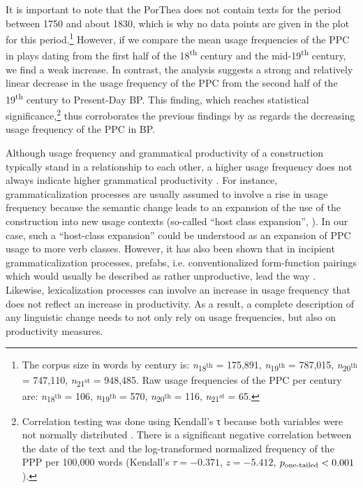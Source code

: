 \documentclass[output=paper,colorlinks,citecolor=brown]{langscibook}
\begin{document}
It is important to note that the PorThea does not contain texts for the period between 1750 and about 1830, which is why no data points are given in the plot for this period.\footnote{The corpus size in words by century is: \textit{n}\textsubscript{18\textsuperscript{th}} = 175,891, \textit{n}\textsubscript{19\textsuperscript{th}} = 787,015, \textit{n}\textsubscript{20\textsuperscript{th}} = 747,110, \textit{n}\textsubscript{21\textsuperscript{st}} = 948,485. Raw usage frequencies of the PPC per century are: \textit{n}\textsubscript{18\textsuperscript{th}} = 106, \textit{n}\textsubscript{19\textsuperscript{th}} = 570, \textit{n}\textsubscript{20\textsuperscript{th}} = 116, \textit{n}\textsubscript{21\textsuperscript{st}} = 65.} However, if we compare the mean usage frequencies of the PPC in plays dating from the first half of the 18\textsuperscript{th} century and the mid-19\textsuperscript{th} century, we find a weak increase. In contrast, the analysis suggests a strong and relatively linear decrease in the usage frequency of the PPC from the second half of the 19\textsuperscript{th} century to Present-Day BP. This finding, which reaches statistical significance,\footnote{Correlation testing was done using Kendall’s τ because both variables were not normally distributed \parencite[cf.][]{Gries2009}. There is a significant negative correlation between the date of the text and the log-transformed normalized frequency of the PPP per 100,000 words (Kendall’s $\tau = -0.371$, $z = -5.412$, $p\textsubscript{one-tailed} < 0.001$).} thus corroborates the previous findings by \textcite{Barbosa2014} as regards the decreasing usage frequency of the PPC in BP. 

Although usage frequency and grammatical productivity of a construction typically stand in a relationship to each other, a higher usage frequency does not always indicate higher grammatical productivity \parencite{Barðdal2008}. For instance, grammaticalization processes are usually assumed to involve a rise in usage frequency because the semantic change leads to an expansion of the use of the construction into new usage contexts (so-called “host class expansion”, \cite{Himmelmann2004}). In our case, such a “host-class expansion” could be understood as an expansion of PPC usage to more verb classes. However, it has also been shown that in incipient grammaticalization processes, prefabs, i.e. conventionalized form-function pairings which would usually be described as rather unproductive, lead the way \citep{BybeeCacoullos2009}. Likewise, lexicalization processes can involve an increase in usage frequency that does not reflect an increase in productivity. As a result, a complete description of any linguistic change needs to not only rely on usage frequencies, but also on productivity measures. 
\end{document}
